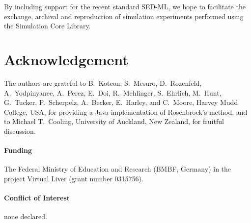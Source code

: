 \documentclass{bioinfo}
\begin{document}

By including support for the recent standard SED-ML, we hope to facilitate the
exchange, archival and reproduction of simulation experiments performed using
the Simulation Core Library.

\section*{Acknowledgement}

The authors are grateful to B.~Kotcon, S.~Mesuro, D.~Rozenfeld, A.~Yodpinyanee,
A.~Perez, E.~Doi, R.~Mehlinger, S.~Ehrlich, M.~Hunt, G.~Tucker, P.~Scherpelz,
A.~Becker, E.~Harley, and C.~Moore, Harvey Mudd College, USA, for providing a
Java implementation of Rosenbrock's method, and to Michael T.~Cooling,
University of Auckland, New Zealand, for fruitful discussion.

\paragraph{Funding\textcolon} 
The Federal Ministry of Education and Research (BMBF, Germany) in the project
Virtual Liver (grant number 0315756).

\paragraph{Conflict of Interest\textcolon} none declared.
\vspace{-.25cm}
\end{document}
